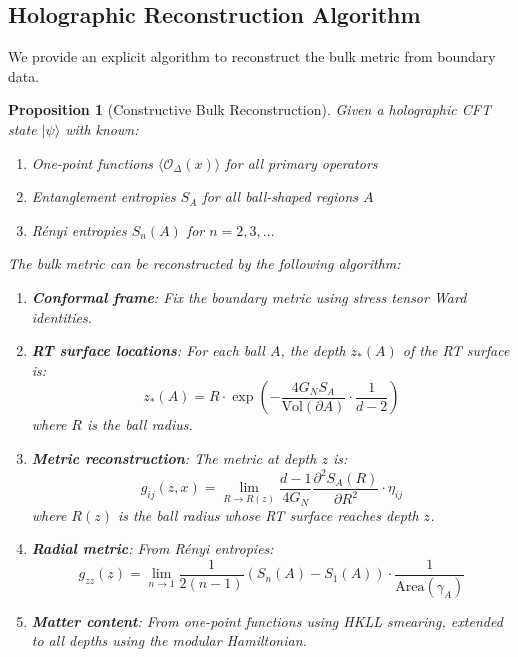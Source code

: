 \documentclass[12pt,a4paper]{article}
\newtheorem{proposition}[theorem]{Proposition}
\begin{document}
\subsection{Holographic Reconstruction Algorithm}

We provide an explicit algorithm to reconstruct the bulk metric from boundary data.

\begin{proposition}[Constructive Bulk Reconstruction]
Given a holographic CFT state $|\psi\rangle$ with known:
\begin{enumerate}
    \item One-point functions $\langle \mathcal{O}_\Delta(x) \rangle$ for all primary operators
    \item Entanglement entropies $S_A$ for all ball-shaped regions $A$
    \item R\'enyi entropies $S_n(A)$ for $n = 2, 3, ...$
\end{enumerate}
The bulk metric can be reconstructed by the following algorithm:
\begin{enumerate}
    \item \textbf{Conformal frame}: Fix the boundary metric using stress tensor Ward identities.
    
    \item \textbf{RT surface locations}: For each ball $A$, the depth $z_*(A)$ of the RT surface is:
    \begin{equation}
    z_*(A) = R \cdot \exp\left( -\frac{4G_N S_A}{\text{Vol}(\partial A)} \cdot \frac{1}{d-2} \right)
    \end{equation}
    where $R$ is the ball radius.
    
    \item \textbf{Metric reconstruction}: The metric at depth $z$ is:
    \begin{equation}
    g_{ij}(z, x) = \lim_{R \to R(z)} \frac{d-1}{4G_N} \frac{\partial^2 S_A(R)}{\partial R^2} \cdot \eta_{ij}
    \end{equation}
    where $R(z)$ is the ball radius whose RT surface reaches depth $z$.
    
    \item \textbf{Radial metric}: From R\'enyi entropies:
    \begin{equation}
    g_{zz}(z) = \lim_{n \to 1} \frac{1}{2(n-1)} \left( S_n(A) - S_1(A) \right) \cdot \frac{1}{\text{Area}(\gamma_A)}
    \end{equation}
    
    \item \textbf{Matter content}: From one-point functions using HKLL smearing, extended to all depths using the modular Hamiltonian.
\end{enumerate}
\end{proposition}
\end{document}
